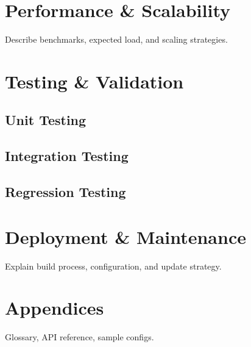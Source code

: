 \documentclass[12pt,a4paper]{article}
\begin{document}
	\section{Performance \& Scalability}
	Describe benchmarks, expected load, and scaling strategies.
	
	\section{Testing \& Validation}
	\subsection{Unit Testing}
	\subsection{Integration Testing}
	\subsection{Regression Testing}
	
	\section{Deployment \& Maintenance}
	Explain build process, configuration, and update strategy.
	
	\section{Appendices}
	Glossary, API reference, sample configs.
	
\end{document}
